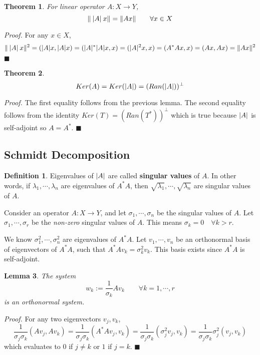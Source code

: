 \documentclass[a4paper,10pt]{book}
\theoremstyle{plain}
\newtheorem{theorem}{Theorem}[section]
\renewenvironment{proof}{\textsl{Proof.}}{\hfill$\blacksquare$}
\theoremstyle{plain}
\newtheorem{lemma}[theorem]{Lemma}
\newenvironment{lproof}{\textsl{Proof.}}{\hfill$\blacksquare$}
\theoremstyle{definition}
\newtheorem{definition}{Definition}[section]
\begin{document}
\begin{theorem}
For linear operator $A: X \rightarrow Y$, 
$$\lVert\: \lvert A\rvert \: x\rVert = \lVert Ax\rVert \qquad \forall x \in X$$ 
\end{theorem}

\begin{proof}
For any $x \in X$, 
$$\lVert\: \lvert A\rvert \: x\rVert^{2} = (\lvert A\rvert x, \lvert A\rvert x) = (\lvert A\rvert^{*} \lvert A\rvert x, x) = (\lvert A\rvert^{2} x, x) = (A^{*} A x, x) = (Ax, Ax) = \lVert Ax\rVert^{2}$$
\end{proof}

\begin{theorem}
$$Ker(A) = Ker(\lvert A\rvert) = (Ran(\lvert A\rvert))^{\perp}$$
\end{theorem}

\begin{proof}
The first equality follows from the previous lemma. The second equality follows from the identity $Ker(T) = (Ran(T^{*}))^{\perp}$ which is true because $\lvert A\rvert$ is self-adjoint so $A = A^{*}$. 
\end{proof}

\subsection{Schmidt Decomposition}

\begin{definition}
Eigenvalues of $\lvert A\rvert$ are called \textbf{singular values} of $A$. In other words, if $\lambda_{1}, \cdots, \lambda_{n}$ are eigenvalues of $A^{*}A$, then $\sqrt{\lambda_{1}}, \cdots, \sqrt{\lambda_{n}}$ are singular values of $A$. 
\end{definition}

Consider an operator $A : X \rightarrow Y$, and let $\sigma_{1}, \cdots, \sigma_{n}$ be the singular values of $A$. Let $\sigma_{1}, \cdots, \sigma_{r}$ be the \textit{non-zero} singular values of $A$. This means $\sigma_{k} = 0 \quad \forall k > r$. 

We know $\sigma_{1}^{2}, \cdots, \sigma_{n}^{2}$ are eigenvalues of $A^{*}A$. Let $v_{1}, \cdots, v_{n}$ be an orthonormal basis of eigenvectors of $A^{*}A$, such that $A^{*}Av_{k} = \sigma_{k}^{2} v_{k}$. This basis exists since $A^{*}A$ is self-adjoint. 

\begin{lemma}
The system 
$$w_{k} := \frac{1}{\sigma_{k}} Av_{k} \qquad \forall k = 1, \cdots, r$$
is an orthonormal system. 
\end{lemma}

\begin{lproof}
For any two eigenvectors $v_{j}, v_{k}$, 
$$\frac{1}{\sigma_{j} \sigma_{k}} (Av_{j}, Av_{k}) = \frac{1}{\sigma_{j} \sigma_{k}} (A^{*} Av_{j}, v_{k}) = \frac{1}{\sigma_{j} \sigma_{k}} (\sigma_{j}^{2} v_{j}, v_{k}) = \frac{1}{\sigma_{j} \sigma_{k}} \sigma_{j}^{2} (v_{j}, v_{k})$$
which evaluates to 0 if $j \neq k$ or $1$ if $j = k$. 
\end{lproof}
\end{document}

